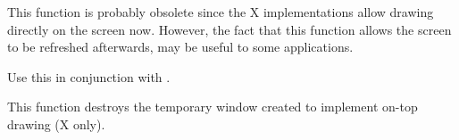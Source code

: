 
This function is probably obsolete since the X implementations
allow drawing directly on the screen now. However, the fact that this
function allows the screen to be refreshed afterwards, may be useful to
some applications.

\label{wxscreendcenddrawingontop}


Use this in conjunction with .

This function destroys the temporary window created to implement on-top drawing (X only).

